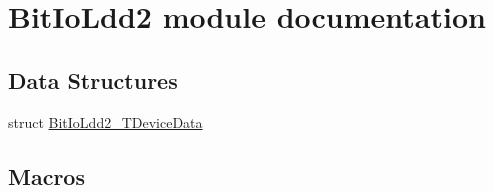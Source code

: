\hypertarget{group___bit_io_ldd2__module}{}\section{Bit\+Io\+Ldd2 module documentation}
\label{group___bit_io_ldd2__module}
\subsection*{Data Structures}
\begin{DoxyCompactItemize}
\item 
struct \hyperlink{struct_bit_io_ldd2___t_device_data}{Bit\+Io\+Ldd2\+\_\+\+T\+Device\+Data}
\end{DoxyCompactItemize}
\subsection*{Macros}
